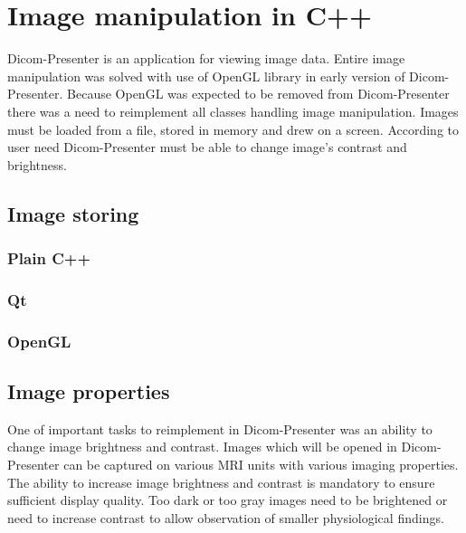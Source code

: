 \chapter*{Image manipulation in C++}

Dicom-Presenter is an application for viewing image data. Entire image manipulation was solved with use of OpenGL library in early version of Dicom-Presenter. Because OpenGL was expected to be removed from Dicom-Presenter there was a need to reimplement all classes handling image manipulation. Images must be loaded from a file, stored in memory and drew on a screen. According to user need Dicom-Presenter must be able to change image's contrast and brightness. 

\section*{Image storing}

\subsection*{Plain C++}

\subsection*{Qt}

\subsection*{OpenGL}


\section*{Image properties}

One of important tasks to reimplement in Dicom-Presenter was an ability to change image brightness and contrast. Images which will be opened in Dicom-Presenter can be captured on various MRI units with various imaging properties. The ability to increase image brightness and contrast is mandatory to ensure sufficient display quality. Too dark or too gray images need to be brightened or need to increase contrast to allow observation of smaller physiological findings.

